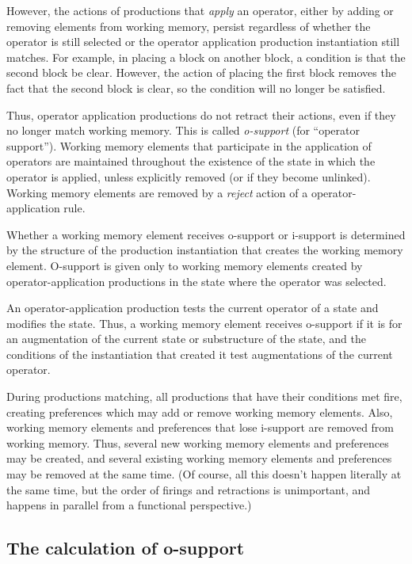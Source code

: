 However, the actions of productions that \emph{apply} an operator, either
by adding or removing elements from working memory, persist regardless of
whether the operator is still selected or the operator application 
production instantiation still matches. For example, in placing a
block on another block, a condition is that the second block be
clear. However, the action of placing the first block removes the fact
that the second block is clear, so the condition will no longer be
satisfied.

Thus, operator application productions do not retract their actions, even
if they no longer match working memory.  This is called \emph{o-support} 
(for ``operator support''). Working memory elements that participate in
the application of operators are maintained throughout the existence of
the state in which the operator is applied, unless explicitly removed (or
if they become unlinked).  Working memory elements are removed by a
\emph{reject} action of a operator-application rule.  

Whether a working memory element receives o-support or i-support is
determined by the structure of the production instantiation that creates
the working memory element.  O-support is given only to working memory
elements created by operator-application productions in the state where
the operator was selected.

An operator-application production tests the current operator of a state
and modifies the state. Thus, a working memory element receives
o-support if it is for an augmentation of the current state or
substructure of the state, and the conditions of the instantiation that
created it test augmentations of the current operator.  

During productions matching, all productions that have their conditions
met fire, creating preferences which may add or remove working memory elements. 
Also, working memory elements and preferences that lose i-support are removed 
from working memory. Thus, several new working memory elements and preferences
may be created, and several existing working memory elements and preferences 
may be removed at the same time. (Of course, all this doesn’t happen literally 
at the same time, but the order of firings and retractions is unimportant, 
and happens in parallel from a functional perspective.)

\subsection{The calculation of o-support}
\label{SUPPORT}

